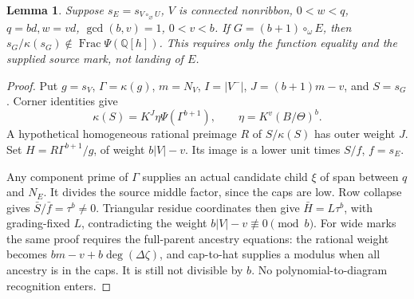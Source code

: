 \documentclass[11pt,a4paper]{amsart}
\numberwithin{equation}{section}
\theoremstyle{plain}
\newtheorem{lemma}[theorem]{Lemma}
\theoremstyle{definition}
\begin{document}
\begin{lemma}\label{lem:empty-nonribbon}
Suppose \(s_E=s_{V\circ_\varnothing U}\), \(V\) is connected nonribbon, \(0<w<q\), \(q=bd,w=vd\), \(\gcd(b,v)=1\), \(0<v<b\).  If \(G=(b+1)\circ_\omega E\), then
\(s_G/\kappa(s_G)\notin\operatorname{Frac}\Psi(\mathbb Q[h])\).
This requires only the function equality and the supplied source mark, not landing of \(E\).
\end{lemma}
\begin{proof}
Put \(g=s_V\), \(\Gamma=\kappa(g)\), \(m=N_V\), \(I=|V^-|\), \(J=(b+1)m-v\), and \(S=s_G\).  Corner identities give
\[
 \kappa(S)=K^J\eta\Psi(\Gamma^{b+1}),\qquad
 \eta=K^v(B/\Theta)^b.
\]
A hypothetical homogeneous rational preimage \(R\) of \(S/\kappa(S)\) has outer weight \(J\).  Set \(H=R\Gamma^{b+1}/g\), of weight \(b|V|-v\).  Its image is a lower unit times \(S/f\), \(f=s_E\).

Any component prime of \(\Gamma\) supplies an actual candidate child \(\xi\) of span between \(q\) and \(N_E\).  It divides the source middle factor, since the caps are low.  Row collapse gives \(\bar S/\bar f=\tau^b\ne0\).  Triangular residue coordinates then give \(\bar H=L\tau^b\), with grading-fixed \(L\), contradicting the weight \(b|V|-v\not\equiv0\pmod b\).  For wide marks the same proof requires the full-parent ancestry equations: the rational weight becomes \(bm-v+b\deg(\Delta\zeta)\), and cap-to-hat supplies a modulus when all ancestry is in the caps.  It is still not divisible by \(b\).  No polynomial-to-diagram recognition enters.
\end{proof}
\end{document}
